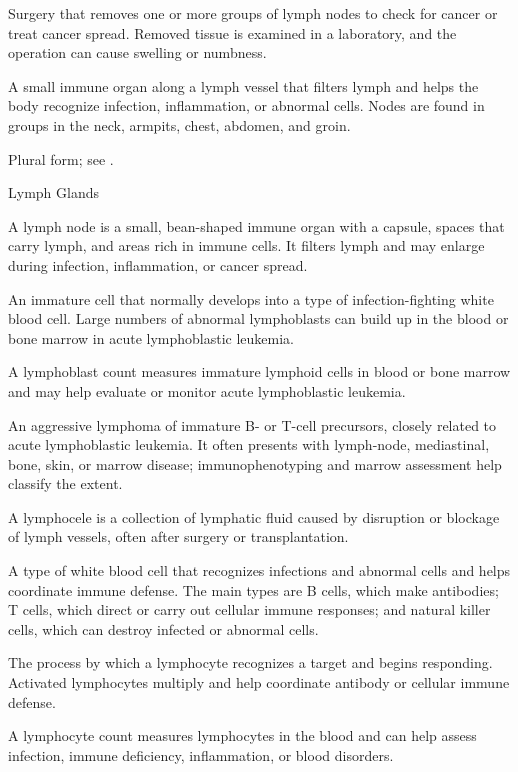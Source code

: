  Surgery that removes one or more groups of lymph nodes to check for cancer or treat cancer spread. Removed tissue is examined in a laboratory, and the operation can cause swelling or numbness.

 A small immune organ along a lymph vessel that filters lymph and helps the body recognize infection, inflammation, or abnormal cells. Nodes are found in groups in the neck, armpits, chest, abdomen, and groin.

 Plural form; see .

\synonyms
Lymph Glands

 A lymph node is a small, bean-shaped immune organ with a capsule, spaces that carry lymph, and areas rich in immune cells. It filters lymph and may enlarge during infection, inflammation, or cancer spread.

 An immature cell that normally develops into a type of infection-fighting white blood cell. Large numbers of abnormal lymphoblasts can build up in the blood or bone marrow in acute lymphoblastic leukemia.

 A lymphoblast count measures immature lymphoid cells in blood or bone marrow and may help evaluate or monitor acute lymphoblastic leukemia.

 An aggressive lymphoma of immature B- or T-cell precursors, closely related to acute lymphoblastic leukemia. It often presents with lymph-node, mediastinal, bone, skin, or marrow disease; immunophenotyping and marrow assessment help classify the extent.

 A lymphocele is a collection of lymphatic fluid caused by disruption or blockage of lymph vessels, often after surgery or transplantation.

 A type of white blood cell that recognizes infections and abnormal cells and helps coordinate immune defense. The main types are B cells, which make antibodies; T cells, which direct or carry out cellular immune responses; and natural killer cells, which can destroy infected or abnormal cells.

 The process by which a lymphocyte recognizes a target and begins responding. Activated lymphocytes multiply and help coordinate antibody or cellular immune defense.

 A lymphocyte count measures lymphocytes in the blood and can help assess infection, immune deficiency, inflammation, or blood disorders.


